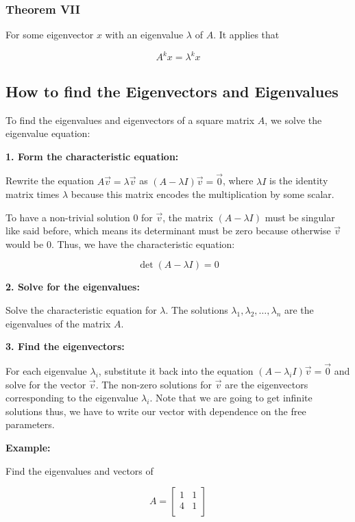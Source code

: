 \subsubsection{Theorem VII}

For some eigenvector \(x\) with an eigenvalue \(\lambda\) of \(A\). It applies that

\[
    A^{k}x = \lambda^{k}x
\]

\subsection{How to find the Eigenvectors and Eigenvalues}

To find the eigenvalues and eigenvectors of a square matrix \(A\), we solve the eigenvalue equation:

\textbf{1. Form the characteristic equation:}

Rewrite the equation \(A\vec{v} = \lambda\vec{v}\) as 
\((A - \lambda I)\vec{v} = \vec{0}\), where \(\lambda I\) is the identity matrix times \(\lambda\) because 
this matrix encodes the multiplication by some scalar. 
    
To have a non-trivial solution \(0\) for \(\vec{v}\), the matrix \((A - \lambda I)\) must be 
singular like said before, which means its determinant must be zero because otherwise \(\vec{v}\) 
would be 0. Thus, we have the characteristic equation:

\[
    \det(A - \lambda I) = 0
\]

\textbf{2. Solve for the eigenvalues:}

Solve the characteristic equation for \(\lambda\). The solutions 
\(\lambda_1, \lambda_2, \dots, \lambda_n\) are the eigenvalues of the matrix \(A\).

\textbf{3. Find the eigenvectors:}

For each eigenvalue \(\lambda_i\), substitute it back into the equation 
\((A - \lambda_i I)\vec{v} = \vec{0}\) and solve for the vector \(\vec{v}\). The non-zero 
solutions for \(\vec{v}\) are the eigenvectors corresponding to the eigenvalue 
\(\lambda_i\). Note that we are going to get infinite solutions thus, we have to write 
our vector with dependence on the free 
parameters.

\textbf{Example:}

Find the eigenvalues and vectors of 

\[
    A = \begin{bmatrix}
        1 & 1 \\
        4 & 1 \\
    \end{bmatrix}
\]

